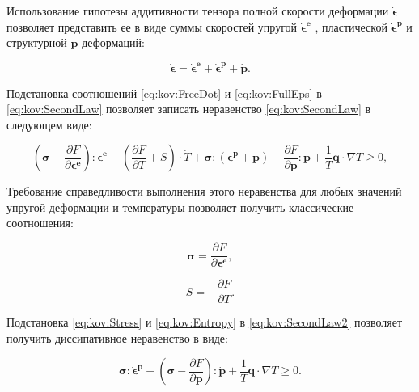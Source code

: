 Использование гипотезы аддитивности тензора полной скорости деформации $\boldsymbol{\dot{\epsilon}}$ позволяет представить ее в виде суммы скоростей упругой $\boldsymbol{\dot{\epsilon}^{e}}$ , пластической $\boldsymbol{\dot{\epsilon}^{p}}$ и структурной $\dot{\boldsymbol{p}}$ деформаций:

\begin{equation}

\boldsymbol{\dot{\epsilon}}=\boldsymbol{\dot{\epsilon}^{e}}+\boldsymbol{\dot{\epsilon}^{p}}+\dot{\boldsymbol{p}}. \label{eq:kov:FullEps}

\end{equation}

Подстановка соотношений \eqref{eq:kov:FreeDot} и \eqref{eq:kov:FullEps} в \eqref{eq:kov:SecondLaw} позволяет записать неравенство \eqref{eq:kov:SecondLaw} в следующем виде:

\begin{equation}

(\boldsymbol{\sigma}-\frac{\partial F}{\partial{\boldsymbol{\epsilon^{e}}}}):\boldsymbol{\dot{\epsilon}^{e}}-(\frac{\partial F}{\partial T}+S)\cdot\dot{T}+\boldsymbol{\sigma}:(\boldsymbol{\dot{\epsilon}^{p}}+\dot{\boldsymbol{p}})-\frac{\partial F}{\partial{\boldsymbol{p}}}:\dot{\boldsymbol{p}}+\frac{1}{T}\boldsymbol{q}\cdot\nabla{T}\geq0, \label{eq:kov:SecondLaw2}

\end{equation}

Требование справедливости  выполнения этого неравенства для любых значений упругой деформации и температуры позволяет получить классические соотношения:

\begin{equation}

\boldsymbol{\sigma}=\frac{\partial F}{\partial{\boldsymbol{\epsilon^{e}}}}, \label{eq:kov:Stress}

\end{equation}

\begin{equation}

S=-\frac{\partial F}{\partial T}. \label{eq:kov:Entropy}

\end{equation}

Подстановка \eqref{eq:kov:Stress} и \eqref{eq:kov:Entropy} в \eqref{eq:kov:SecondLaw2} позволяет получить диссипативное неравенство в виде:

\begin{equation}

\boldsymbol{\sigma}:\boldsymbol{\dot{\epsilon}^{p}}+(\boldsymbol{\sigma}-\frac{\partial F}{\partial{\boldsymbol{p}}}):\dot{\boldsymbol{p}}+\frac{1}{T}\boldsymbol{q}\cdot\nabla{T}\geq0. \label{eq:kov:Dissip}

\end{equation}


